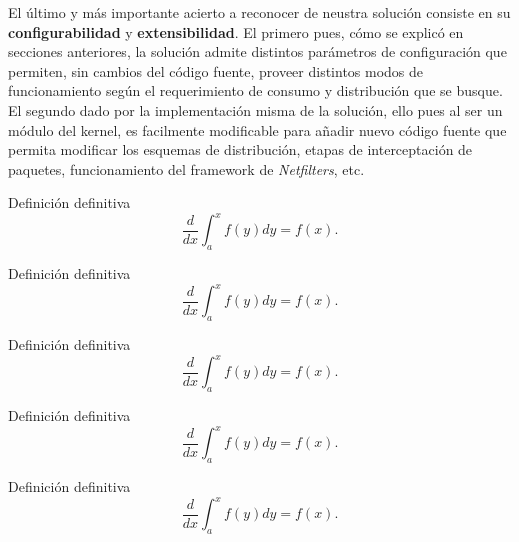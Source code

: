 El último y más importante acierto a reconocer de neustra solución consiste en su \textbf{configurabilidad} y \textbf{extensibilidad}. El primero pues, cómo se explicó en secciones anteriores, la solución admite distintos parámetros de configuración que permiten, sin cambios del código fuente, proveer distintos modos de funcionamiento según el requerimiento de consumo y distribución que se busque. El segundo dado por la implementación misma de la solución, ello pues al ser un módulo del kernel, es facilmente modificable para añadir nuevo código fuente que permita modificar los esquemas de distribución, etapas de interceptación de paquetes, funcionamiento del framework de \emph{Netfilters}, etc.

\begin{defn} Definición definitiva $$\frac{d}{dx}\int_a^xf(y)dy=f(x).$$\end{defn}

\begin{teo} Definición definitiva $$\frac{d}{dx}\int_a^xf(y)dy=f(x).$$\end{teo}

\begin{prop} Definición definitiva $$\frac{d}{dx}\int_a^xf(y)dy=f(x).$$\end{prop}

\begin{obs} Definición definitiva $$\frac{d}{dx}\int_a^xf(y)dy=f(x).$$\end{obs}

\begin{ej} Definición definitiva $$\frac{d}{dx}\int_a^xf(y)dy=f(x).$$\end{ej}